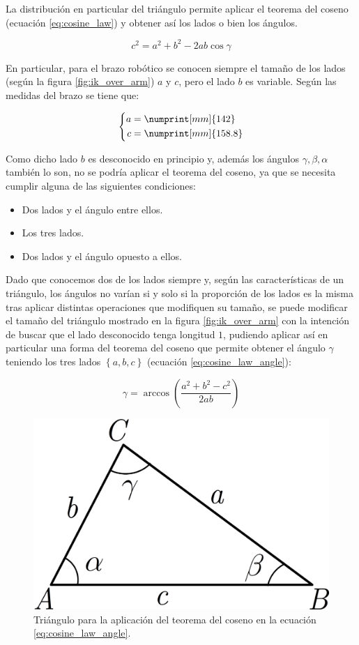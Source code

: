 La distribución en particular del triángulo permite aplicar el teorema del coseno (ecuación
\ref{eq:cosine_law}) y obtener así los lados o bien los ángulos.

\begin{equation}\label{eq:cosine_law}
    c^2 = a^2 + b^2 - 2ab\cos{\gamma}
\end{equation}

En particular, para el brazo robótico se conocen siempre el tamaño de los lados
(según la figura \ref{fig:ik_over_arm}) $a$ y $c$, pero el lado $b$ es variable. Según las
medidas del brazo se tiene que:

\begin{equation*}
    \left\{
    \begin{aligned}
        a & = \numprint[mm]{142}   \\
        c & = \numprint[mm]{158.8}
    \end{aligned}
    \right.
\end{equation*}

Como dicho lado $b$ es desconocido en principio y, además los ángulos $\gamma, \beta, \alpha$
también lo son, no se podría aplicar el teorema del coseno, ya que se necesita cumplir alguna de las
siguientes condiciones:

\begin{itemize}
    \item Dos lados y el ángulo entre ellos.
    \item Los tres lados.
    \item Dos lados y el ángulo opuesto a ellos.
\end{itemize}

Dado que conocemos dos de los lados siempre y, según las características de un triángulo,
los ángulos no varían si y solo si la proporción de los lados es la misma tras aplicar
distintas operaciones que modifiquen su tamaño, se puede modificar el tamaño del triángulo
mostrado en la figura \ref{fig:ik_over_arm} con la intención de buscar que el lado
desconocido tenga longitud $1$, pudiendo aplicar así en particular una forma del
teorema del coseno que permite obtener el ángulo $\gamma$ teniendo los tres lados $\left\{a,b,c\right\}$
(ecuación \ref{eq:cosine_law_angle}):

\begin{equation}\label{eq:cosine_law_angle}
    \gamma = \arccos{\left(\frac{a^2 + b^2 - c^2}{2ab}\right)}
\end{equation}

\begin{figure}[H]
    \centering
    \includegraphics[width=.3\linewidth]{pictures/cosine_law.png}
    \caption{Triángulo para la aplicación del teorema del coseno en la ecuación \ref{eq:cosine_law_angle}.}
    \label{fig:cosine_law_triangle}
\end{figure}

